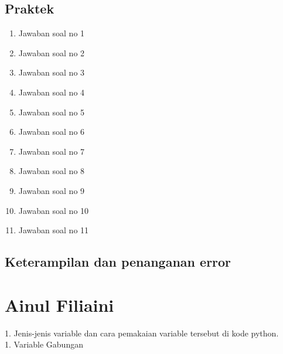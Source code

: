\subsection{Praktek}
\begin{enumerate}
    \item Jawaban soal no 1
    
    \item Jawaban soal no 2
    
    \item Jawaban soal no 3
    
    \item Jawaban soal no 4
    
    \item Jawaban soal no 5
    
    \item Jawaban soal no 6
    
    \item Jawaban soal no 7
    
    \item Jawaban soal no 8
    
    \item Jawaban soal no 9
    
    \item Jawaban soal no 10
    
    \item Jawaban soal no 11
    
\end{enumerate}

\subsection{Keterampilan dan penanganan error}
    

\section{Ainul Filiaini}

1. Jenis-jenis variable dan cara pemakaian variable tersebut di kode python.\\
1. Variable Gabungan\\
     
